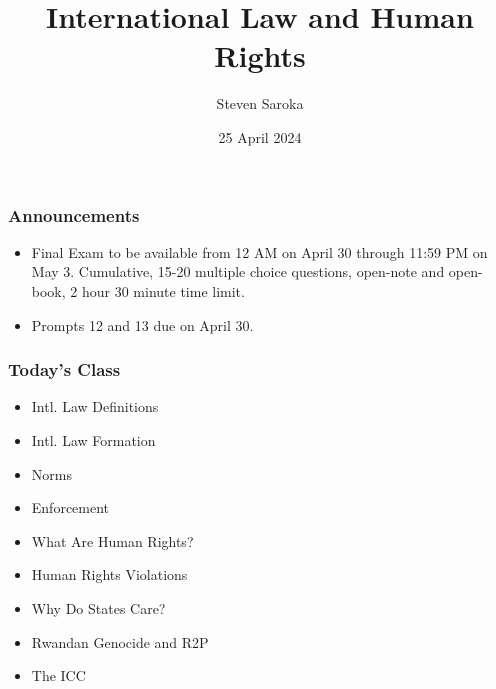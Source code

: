 \documentclass[handout]{beamer}
\title[International Law and Human Rights]{\LARGE{International Law and Human Rights}}
\author[POLI 150]{Steven Saroka}
\institute{POLI 150}
\date{25 April 2024}
\begin{document}
\begin{frame}
\titlepage %
\end{frame}



\begin{frame} 
	\frametitle{\LARGE{Announcements}}
	\begin{itemize}
		\item Final Exam to be available from 12 AM on April 30 through 11:59 PM on May 3. Cumulative, 15-20 multiple choice questions, open-note and open-book, 2 hour 30 minute time limit.
		\item Prompts 12 and 13 due on April 30.
	
	\end{itemize}
\end{frame}


\begin{frame} 
	\frametitle{\LARGE{Today's Class}}
	\begin{itemize}

			\item Intl. Law Definitions 

			\item Intl. Law Formation  

			\item Norms 

			\item Enforcement 

			\item What Are Human Rights?

			\item Human Rights Violations

			\item Why Do States Care?

			\item Rwandan Genocide and R2P

			\item The ICC
		
	\end{itemize}
\end{frame}
\end{document}
